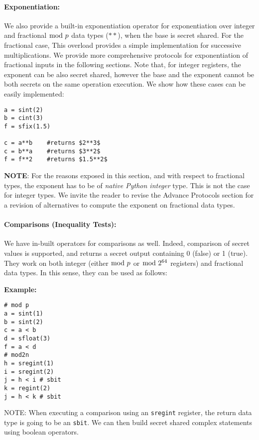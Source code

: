 \paragraph{Exponentiation:}
We also provide a built-in exponentiation operator for exponentiation over integer and 
fractional $\bmod \; p$ data types ($**$), when the base is secret shared. 
For the fractional case, 
This overload provides a simple implementation for successive multiplications. 
We provide more comprehensive protocols for exponentiation of fractional inputs 
in the following sections. 
Note that, for integer registers, the exponent can be also secret shared, 
however the base and the exponent cannot be both secrets on the same operation execution. 
We show how these cases can be easily implemented: 
\begin{lstlisting}
a = sint(2)
b = cint(3)
f = sfix(1.5)

c = a**b 	#returns $2**3$
c = b**a 	#returns $3**2$
f = f**2	#returns $1.5**2$
\end{lstlisting}
\textbf{NOTE}: For the reasons exposed in this section, and with respect to fractional types, 
the exponent has to be of \textit{native Python integer} type. 
This is not the case for integer types. We invite the reader to revise the Advance Protocols 
section for a revision of alternatives to compute the exponent on fractional data types.

\paragraph{Comparisons (Inequality Tests):}
We have in-built operators for comparisons as well. 
Indeed, comparison of secret values is supported, 
and returns a secret output containing 0 (false) or 1 (true).
They work on both integer (either $\bmod \; p$ or $\bmod \; 2^{64}$ registers) and fractional data types. 
In this sense, they can be used as follows: 

\noindent
\textbf{Example:}
\begin{lstlisting}
# mod p
a = sint(1)
b = sint(2)
c = a < b
d = sfloat(3)
f = a < d
# mod2n
h = sregint(1)
i = sregint(2)
j = h < i # sbit     
k = regint(2)
j = h < k # sbit     
\end{lstlisting}

\noindent
NOTE: When executing a comparison using an \verb|sregint| register, the return data type is going to be an \verb|sbit|. We can then build secret shared complex statements using boolean operators.

